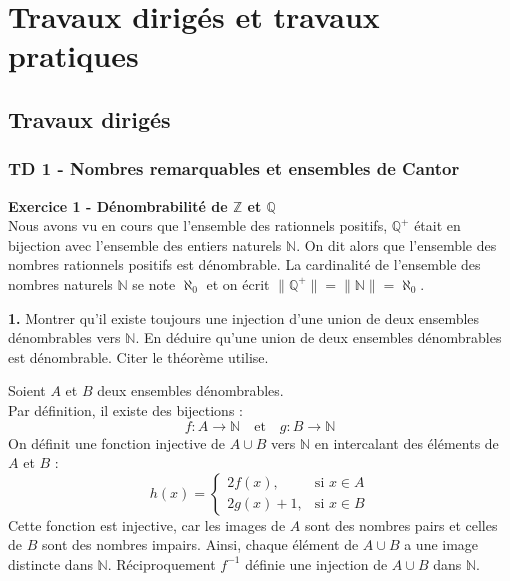 \chapter{Travaux dirig\'es et travaux pratiques}\label{chap:td_tp}

    \section{Travaux dirig\'es}\label{sec:exos}
    \subsection{TD 1 - Nombres remarquables et ensembles de Cantor}\label{td_1}
    \hspace*{-2.65cm}\textbf{Exercice 1 - Dénombrabilité de \(\mathbb{Z}\) et \(\mathbb{Q}\)}\\
    Nous avons vu en cours que l'ensemble des rationnels positifs, \(\mathbb{Q^+}\) était en bijection avec l'ensemble des entiers naturels \(\mathbb{N}\). On dit alors que l'ensemble des nombres rationnels positifs est dénombrable. La cardinalité de l'ensemble des nombres naturels \(\mathbb{N}\) se note \(\aleph_0\) et on écrit \(\|\mathbb{Q^+}\|=\|\mathbb{N}\|=\aleph_0\).\par

    
    \hspace*{-1.5em}\textbf{1.} Montrer qu'il existe toujours une injection d'une union de deux ensembles dénombrables vers \(\mathbb{N}\). En déduire qu'une union de deux ensembles dénombrables est dénombrable. Citer le théorème utilise.\par
    Soient \( A \) et \( B \) deux ensembles d\'enombrables.\\
    Par d\'efinition, il existe des bijections :  
    \begin{equation}
        f: A \to \mathbb{N} \quad \text{et} \quad g: B \to \mathbb{N}
    \end{equation}
    On d\'efinit une fonction injective de \( A \cup B \) vers \( \mathbb{N} \) en intercalant des \'el\'ements de \( A \) et \( B \) :
    \begin{equation}
        h(x) =
        \begin{cases}
            2f(x), & \text{si } x \in A \\
            2g(x) + 1, & \text{si } x \in B
        \end{cases}
    \end{equation}
    Cette fonction est injective, car les images de \( A \) sont des nombres pairs et celles de \( B \) sont des nombres impairs. Ainsi, chaque \'el\'ement de \( A \cup B \) a une image distincte dans \( \mathbb{N} \).
    Réciproquement \(f^{-1}\) définie une injection de \(A\cup B\) dans \(\mathbb{N}\).

